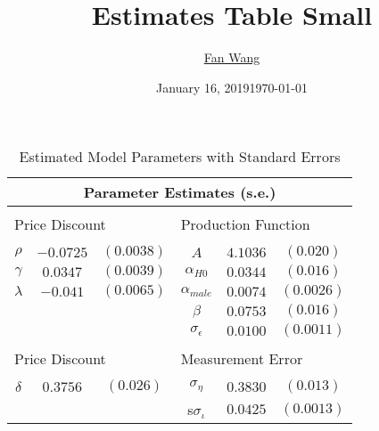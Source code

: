 \documentclass[12pt,english]{article}
\date{January 16, 2019}
\title{Estimates Table Small}
\author{\href{fanwangecon.github.io}{Fan Wang}}
\date{\today}
\begin{document}
\maketitle

\begin{table}[!ht]
\centering{}
{\small
	\caption{\label{tab:paramesti}Estimated Model Parameters with Standard Errors}
	\begin{tabular}{|c|cc|c|cc}
		\toprule
		\multicolumn{6}{c}{\textbf{Parameter Estimates (s.e.) }} \\
		\midrule
		\multicolumn{6}{c}{\vspace{-3mm}} \\
		\multicolumn{3}{l}{Price Discount}	& \multicolumn{3}{l}{Production Function} \\
		\multicolumn{6}{c}{\vspace{-3mm}} \\
		$\rho$  & $-0.0725$  & $(0.0038) $ 	 	&        $A$ & $4.1036$ & $(0.020)$ \\
		$\gamma$ & $0.0347$  & $(0.0039) $ 	    &    	 $\alpha_{H0}$ & $0.0344$ & $(0.016)$ \\
		$\lambda$ & $-0.041$ & $(0.0065) $      &        $\alpha_{male}$ & $0.0074$ & $(0.0026)$ \\
   		\multicolumn{2}{c}{} 	              & &        $\beta$ & $0.0753$ & $(0.016)$  \\
   		\multicolumn{2}{c}{} 	              & &        $\sigma_\epsilon$ & $0.0100$ &   $(0.0011)$ \\		
		\multicolumn{6}{c}{} \\
		\multicolumn{3}{l}{Price Discount} & \multicolumn{3}{l}{Measurement Error} \\
		\multicolumn{6}{c}{\vspace{-3mm}} \\		
		$\delta$ & $0.3756$ & $(0.026)$ & $\sigma_\eta$ & $0.3830$ & $(0.013)$ \\
   		\multicolumn{2}{c}{} 	              & &        s$\sigma_\iota$ & $0.0425$ &   $(0.0013)$ \\
		\bottomrule
	\end{tabular}
}
\end{table}
\end{document}
